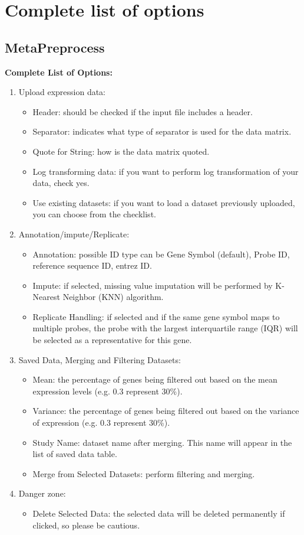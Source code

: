 \section{Complete list of options}
\label{sec:completeList}

\subsection*{MetaPreprocess}
\label{sec:completeList_MetaPreprocess}


\textbf{Complete List of Options:} 
\begin{enumerate}
\item Upload expression data:
\begin{itemize}
\item Header: should be checked if the input file includes a header.
\item Separator: indicates what type of separator is used for the data matrix.
\item Quote for String: how is the data matrix quoted.
\item Log transforming data: if you want to perform log transformation of your data, check yes.
\item Use existing datasets: if you want to load a dataset previously uploaded, you can choose from the checklist.
\end{itemize}
\item Annotation/impute/Replicate:
\begin{itemize}
\item Annotation: possible ID type can be Gene Symbol (default), Probe ID, reference sequence ID, entrez ID.
\item Impute: if selected, missing value imputation will be performed by K-Nearest Neighbor (KNN) algorithm.
\item Replicate Handling: if selected and if the same gene symbol maps to multiple probes, the probe with the largest interquartile range (IQR) will be selected
as a representative for this gene.
\end{itemize}
\item Saved Data, Merging and Filtering Datasets:
\begin{itemize}
\item Mean: the percentage of genes being filtered out based on the mean expression levels (e.g. 0.3 represent 30\%).
\item Variance: the percentage of genes being filtered out based on the variance of expression (e.g. 0.3 represent 30\%).
\item Study Name: dataset name after merging. This name will appear in the list of saved data table.
\item Merge from Selected Datasets: perform filtering and merging.
\end{itemize}
\item Danger zone:
\begin{itemize}
\item Delete Selected Data: the selected data will be deleted permanently if clicked, so please be cautious.
\end{itemize}

\end{enumerate}

